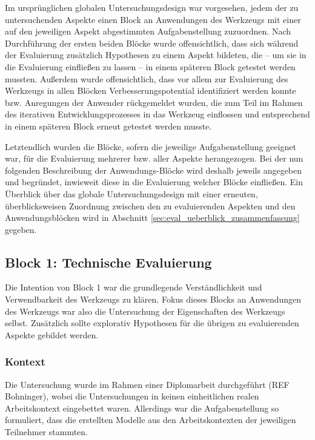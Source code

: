 Im ursprünglichen globalen Untersuchungsdesign war vorgesehen, jedem der zu untersuchenden Aspekte einen Block an Anwendungen des Werkzeugs mit einer auf den jeweiligen Aspekt abgestimmten Aufgabenstellung zuzuordnen. Nach Durchführung der ersten beiden Blöcke wurde offensichtlich, dass sich während der Evaluierung zusätzlich Hypothesen zu einem Aspekt bildeten, die -- um sie in die Evaluierung einfließen zu lassen -- in einem späteren Block getestet werden mussten. Außerdem wurde offensichtlich, dass vor allem zur Evaluierung des Werkzeugs in allen Blöcken Verbesserungspotential identifiziert werden konnte bzw. Anregungen der Anwender rückgemeldet wurden, die zum Teil im Rahmen des iterativen Entwicklungsprozesses in das Werkzeug einflossen und entsprechend in einem späteren Block erneut getestet werden musste. 

Letztendlich wurden die Blöcke, sofern die jeweilige Aufgabenstellung geeignet war, für die Evaluierung mehrerer bzw. aller Aspekte herangezogen. Bei der nun folgenden Beschreibung der Anwendungs-Blöcke wird deshalb jeweils angegeben und begründet, inwieweit diese in die Evaluierung welcher Blöcke einfließen. Ein Überblick über das globale Untersuchungsdesign mit einer erneuten, überblicksweisen Zuordnung zwischen den zu evaluierenden Aspekten und den Anwendungsblöcken wird in Abschnitt \ref{sec:eval_ueberblick_zusammenfassung} gegeben.

\subsection{Block 1: Technische Evaluierung}
\label{sub:eval_1}

Die Intention von Block 1 war die grundlegende Verständlichkeit und Verwendbarkeit des Werkzeugs zu klären. Fokus dieses Blocks an Anwendungen des Werkzeugs war also die Untersuchung der Eigenschaften des Werkzeugs selbst. Zusätzlich sollte explorativ Hypothesen für die übrigen zu evaluierenden Aspekte gebildet werden.

\subsubsection{Kontext} %
\label{ssub:1_kontext}

Die Untersuchung wurde im Rahmen einer Diplomarbeit durchgeführt (REF Bohninger), wobei die Untersuchungen in keinen einheitlichen realen Arbeitskontext eingebettet waren. Allerdings war die Aufgabenstellung so formuliert, dass die erstellten Modelle aus den Arbeitskontexten der jeweiligen Teilnehmer stammten.

